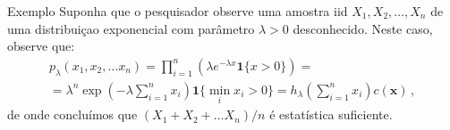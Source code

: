 \documentclass[11pt]{beamer}
\begin{document}
	\begin{frame}{Exemplo}
		Suponha que o pesquisador observe uma amostra iid $X_1,X_2, \ldots, X_n$ de uma distribuiçao exponencial com parâmetro $\lambda > 0$ desconhecido.  Neste caso, observe que:
		\begin{equation*}
			\begin{aligned}
				p_\lambda(x_1,x_2,\ldots x_n) = \prod_{i=1}^n (\lambda e^{-\lambda x} \mathbf{1}\{x>0\}) =\\ =  \lambda^n \exp\left(- \lambda \sum_{i=1}^n x_i\right)\mathbf{1}\{\min_i x_i > 0 \} = h_\lambda \left(\sum_{i=1}^n x_i\right) c(\boldsymbol{x}) \, ,
			\end{aligned}
		\end{equation*}
		de onde concluímos que $(X_1+X_2 + \ldots X_n)/n$ é estatística suficiente.
		
	\end{frame}
	
\end{document}
